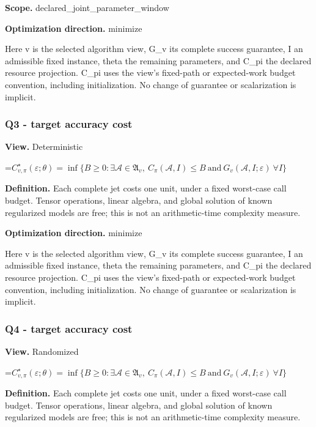 \documentclass[10pt,a4paper]{article}
\newcommand{\AtlasMath}[1]{\par\begingroup\centering\setbox0=\hbox{$\displaystyle #1$}\ifdim\wd0>1.4\linewidth\typeout{ATLAS WIDE FORMULA: \the\wd0}\fi\ifdim\wd0>\linewidth\resizebox{\linewidth}{!}{\box0}\else\box0\fi\par\endgroup}
\begin{document}
\textbf{Scope.} declared\_\allowbreak{}joint\_\allowbreak{}parameter\_\allowbreak{}window

\textbf{Optimization direction.} minimize

Here v is the selected algorithm view, G\_\allowbreak{}v its complete success guarantee, I an admissible fixed instance, theta the remaining parameters, and C\_\allowbreak{}pi the declared resource projection. C\_\allowbreak{}pi uses the view's fixed-path or expected-work budget convention, including initialization. No change of guarantee or scalarization is implicit.

\subsubsection{Q3 - target accuracy cost}
\textbf{View.} Deterministic

\AtlasMath{C^\star_{v,\pi}(\varepsilon;\theta)=\inf\{B\ge0:\exists\mathcal A\in\mathfrak A_v,\ C_\pi(\mathcal A,I)\le B\ \text{and}\ G_v(\mathcal A,I;\varepsilon)\ \forall I\}}
\textbf{Definition.} Each complete jet costs one unit, under a fixed worst-case call budget. Tensor operations, linear algebra, and global solution of known regularized models are free; this is not an arithmetic-time complexity measure.

\textbf{Optimization direction.} minimize

Here v is the selected algorithm view, G\_\allowbreak{}v its complete success guarantee, I an admissible fixed instance, theta the remaining parameters, and C\_\allowbreak{}pi the declared resource projection. C\_\allowbreak{}pi uses the view's fixed-path or expected-work budget convention, including initialization. No change of guarantee or scalarization is implicit.

\subsubsection{Q4 - target accuracy cost}
\textbf{View.} Randomized

\AtlasMath{C^\star_{v,\pi}(\varepsilon;\theta)=\inf\{B\ge0:\exists\mathcal A\in\mathfrak A_v,\ C_\pi(\mathcal A,I)\le B\ \text{and}\ G_v(\mathcal A,I;\varepsilon)\ \forall I\}}
\textbf{Definition.} Each complete jet costs one unit, under a fixed worst-case call budget. Tensor operations, linear algebra, and global solution of known regularized models are free; this is not an arithmetic-time complexity measure.
\end{document}
